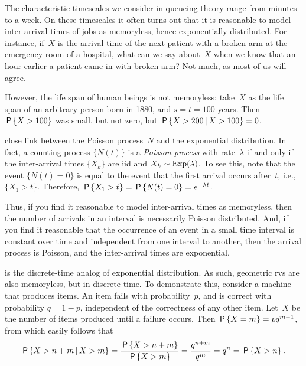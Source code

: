 \documentclass[queueing-book.tex]{subfiles}
\begin{document}
The characteristic timescales we consider in queueing theory range from minutes to a week.
On these timescales it often turns out that it is reasonable to model inter-arrival times of jobs as memoryless, hence exponentially distributed.
For instance, if~$X$ is the arrival time of the next patient with a broken arm at the emergency room of a hospital, what can we say about~$X$ when we know that an hour earlier a patient came in with broken arm?
Not much, as most of us will agree.

However, the life span of human beings is not memoryless: take~$X$ as the life span of an arbitrary person born in 1880, and $s=t = 100$ years. Then $\P{X>100}$ was small, but not zero, but $\P{X>200 \given X>100} = 0$.%


 close link between the Poisson process~$N$ and the exponential distribution.
In fact, a counting process $\{N(t)\}$ is a \emph{Poisson process} with rate~$\lambda$ if and only if the inter-arrival times $\{X_k\}$ are iid and $X_{k} \sim \Exp{\lambda}$.
To see this, note that the event $\{N(t)= 0\}$ is equal to the event that the first arrival occurs after~$t$, i.e., $\{X_1 > t\}$.
Therefore, $\P{X_1> t} = \P{N(t) = 0} = e^{-\lambda t}$.


Thus, if you find it reasonable to model inter-arrival times as memoryless, then the number of arrivals in an interval is necessarily Poisson distributed.
And, if you find it reasonable that the occurrence of an event in a small time interval is constant over time and independent from one interval to another, then the arrival process is Poisson, and the inter-arrival times are exponential.


 is the discrete-time analog of exponential distribution.
As such, geometric rvs are also memoryless, but in discrete time.
To demonstrate this, consider a machine that produces items.
An item fails with probability~$p$, and is correct with probability $q=1-p$, independent of the correctness of any other item.
Let~$X$ be the number of items produced until a failure occurs.  Then $\P{X=m} =  p q^{m-1}$, from which easily follows that
\begin{equation*}
\P{X>n+m\given X>m} = \frac{\P{X>n+m}}{\P{X>m}} = \frac{q^{n+m}}{q^m}=q^{n} = \P{X>n}.
\end{equation*}
\end{document}
